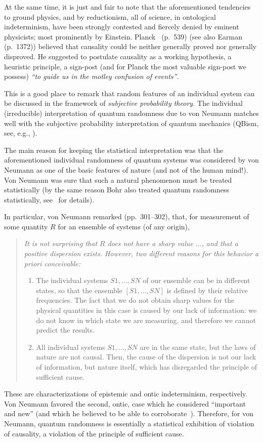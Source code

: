 \documentclass[entropy,editorial,accept,moreauthors,pdftex,10pt,a4paper]{Definitions/mdpi}
\begin{document}
 At the same time, it is just and fair to note that the aforementioned tendencies to ground physics,
and by reductionism, all of science, in ontological indeterminism,
have been strongly contested and fiercely denied by eminent physicists; most prominently by Einstein.
Planck~\cite{Planck-32-coc} (p.~539) (see also Earman~\cite{Earman20071369} (p.~1372)) believed that causality
could be neither generally proved nor generally disproved. He suggested to postulate causality
as a working hypothesis, a
heuristic principle, a sign-post (and for Planck the most valuable sign-post we
possess) {\it ``to guide us in the motley confusion of events''}.

This is a good place to remark that random features of an individual system can be discussed in the framework of {\it subjective probability theory.}
The individual (irreducible) interpretation of quantum randomness due to von Neumann  matches well with the subjective probability interpretation
of quantum mechanics (QBism, see, e.g., \cite{F1, F2}).

The main reason for keeping the statistical interpretation was that the aforementioned individual
randomness of quantum systems was considered  by von Neumann as one of the basic features
of nature (and not of the human mind!). Von Neumann was sure that such a
natural phenomenon must be treated statistically (by the same reason Bohr also treated
quantum randomness statistically, \mbox{see \cite{AKHP}} for details).

In particular, von Neumann remarked \cite{VN} (pp.~301--302), that, for measurement of some quantity $R$ for an ensemble of systems (of
any origin),
\begin{quote}
{\it It is not surprising that $R$ does not have a sharp value $\ldots$, and that a positive
dispersion exists. However, two different reasons for this behavior a priori
conceivable:
\begin{enumerate}[leftmargin=6mm,labelsep=3mm]
\item  The individual systems $S1, \ldots , SN$ of our ensemble can be in different states,
so that the ensemble $[S1, \ldots , SN]$ is defined by their relative frequencies. The fact
that we do not obtain sharp values for the physical quantities in this case is caused
by our lack of information: we do not know in which state we are measuring, and
therefore we cannot predict the results.
\item   All individual systems $S1, \ldots , SN$ are in the same state, but the laws of
nature are not causal. Then, the cause of the dispersion is not our lack of
information, but nature itself, which has disregarded the principle of sufficient
cause.
\end{enumerate}
}
\end{quote}
These are characterizations of epistemic and ontic indeterminism, respectively.
Von Neumann favored the second, ontic, case which he considered  ``important and new''
(and which he believed to be able to corroborate~\cite{Dieks-2017}).
Therefore, for von Neumann, quantum randomness is essentially a statistical exhibition of violation
of causality, a violation of the principle of sufficient cause. %
\end{document}
